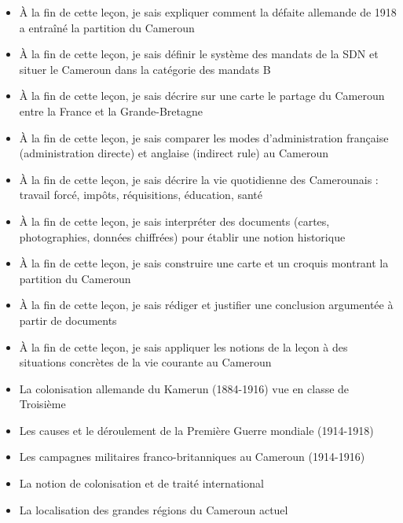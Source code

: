 \documentclass[11pt]{article}
\begin{document}
\begin{objectifs}
\begin{itemize}
\item À la fin de cette leçon, je sais expliquer comment la défaite allemande de 1918 a entraîné la partition du Cameroun
\item À la fin de cette leçon, je sais définir le système des mandats de la SDN et situer le Cameroun dans la catégorie des mandats B
\item À la fin de cette leçon, je sais décrire sur une carte le partage du Cameroun entre la France et la Grande-Bretagne
\item À la fin de cette leçon, je sais comparer les modes d'administration française (administration directe) et anglaise (indirect rule) au Cameroun
\item À la fin de cette leçon, je sais décrire la vie quotidienne des Camerounais : travail forcé, impôts, réquisitions, éducation, santé
\item À la fin de cette leçon, je sais interpréter des documents (cartes, photographies, données chiffrées) pour établir une notion historique
\item À la fin de cette leçon, je sais construire une carte et un croquis montrant la partition du Cameroun
\item À la fin de cette leçon, je sais rédiger et justifier une conclusion argumentée à partir de documents
\item À la fin de cette leçon, je sais appliquer les notions de la leçon à des situations concrètes de la vie courante au Cameroun
\end{itemize}
\end{objectifs}

\begin{prerequis}
\begin{itemize}
\item La colonisation allemande du Kamerun (1884-1916) vue en classe de Troisième
\item Les causes et le déroulement de la Première Guerre mondiale (1914-1918)
\item Les campagnes militaires franco-britanniques au Cameroun (1914-1916)
\item La notion de colonisation et de traité international
\item La localisation des grandes régions du Cameroun actuel
\end{itemize}
\end{prerequis}
\end{document}
